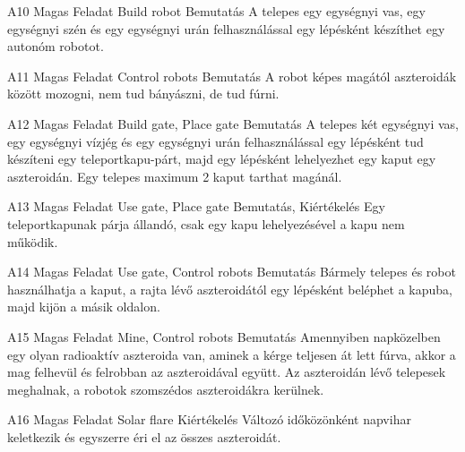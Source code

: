 \documentclass[../../projlab]{subfiles}
\begin{document}
\begin{funkovetelmeny}
	{A10}
	{Magas}
	{Feladat}
	{Build robot}
	{Bemutatás}
	{A telepes egy egységnyi vas, egy egységnyi szén és egy egységnyi urán felhasználással egy lépésként készíthet egy autonóm robotot.}
    
\end{funkovetelmeny}

\begin{funkovetelmeny}
	{A11}
	{Magas}
	{Feladat}
	{Control robots}
	{Bemutatás}
	{A robot képes magától aszteroidák között mozogni, nem tud bányászni, de tud fúrni.}
    
\end{funkovetelmeny}

\begin{funkovetelmeny}
	{A12}
	{Magas}
	{Feladat}
	{Build gate, Place gate}
	{Bemutatás}
	{A telepes két egységnyi vas, egy egységnyi vízjég és egy egységnyi urán felhasználással egy lépésként tud készíteni egy teleportkapu-párt, majd egy lépésként lehelyezhet egy kaput egy aszteroidán. Egy telepes maximum 2 kaput tarthat magánál.}
    
\end{funkovetelmeny}

\begin{funkovetelmeny}
	{A13}
	{Magas}
	{Feladat}
	{Use gate, Place gate}
	{Bemutatás, Kiértékelés}
	{Egy teleportkapunak párja állandó, csak egy kapu lehelyezésével a kapu nem működik.}
    
\end{funkovetelmeny}

\begin{funkovetelmeny}
	{A14}
	{Magas}
	{Feladat}
	{Use gate, Control robots}
	{Bemutatás}
	{Bármely telepes és robot használhatja a kaput, a rajta lévő aszteroidától egy lépésként beléphet a kapuba, majd kijön a másik oldalon.}
    
\end{funkovetelmeny}

\begin{funkovetelmeny}
	{A15}
	{Magas}
	{Feladat}
	{Mine, Control robots}
	{Bemutatás}
	{Amennyiben napközelben egy olyan radioaktív aszteroida van, aminek a kérge teljesen át lett fúrva, akkor a mag felhevül és felrobban az aszteroidával együtt. Az aszteroidán lévő telepesek meghalnak, a robotok szomszédos aszteroidákra kerülnek.}
    
\end{funkovetelmeny}

\begin{funkovetelmeny}
	{A16}
	{Magas}
	{Feladat}
	{Solar flare}
	{Kiértékelés}
	{Változó időközönként napvihar keletkezik és egyszerre éri el az összes aszteroidát.}
    
\end{funkovetelmeny}
\end{document}
